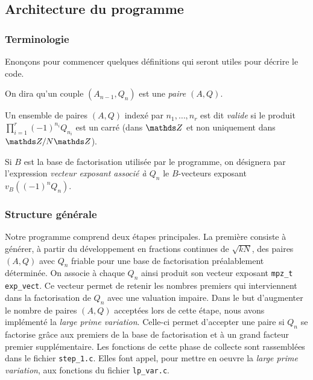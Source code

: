 \subsection{Architecture du programme}

\subsubsection{Terminologie}

Enonçons pour commencer quelques définitions qui seront utiles pour décrire le code.


\begin{definition}
	On dira qu'un couple $(A_{n-1}, Q_n)$ est une \emph{paire $(A, Q)$}.
\end{definition}

\begin{definition}
	Un ensemble de paires $(A, Q)$ indexé par $n_1, \dots, n_r$ est dit
	\emph{valide} si le produit $\prod_{i=1}^r (-1)^{n_i} Q_{n_i}$ est un carré
	(dans $\Z$ et non uniquement dans $\Z/N\Z$).
\end{definition}

\begin{definition}
    Si $B$ est la base de factorisation utilisée par le programme, on 
    désignera par l'expression \emph{vecteur exposant associé à $Q_n$} 
    le $B$-vecteurs exposant $v_B((-1)^n Q_n)$.
\end{definition}

\subsubsection{Structure générale}

Notre programme comprend deux étapes principales. La première consiste à générer, 
à partir du développement en fractions continues de $ \sqrt{kN} $, des paires 
$(A, Q)$ avec $Q_n$ friable pour une base de factorisation préalablement déterminée.
On associe à chaque $Q_n$ ainsi produit son vecteur exposant \texttt{mpz\_t exp\_vect}.
Ce vecteur permet de retenir les nombres premiers qui interviennent dans la 
factorisation de $Q_n$ avec une valuation impaire. Dans le but d'augmenter le nombre
de paires $(A,Q) $ acceptées lors de cette étape, nous avons implémenté la 
\textit{large prime variation}. Celle-ci permet d'accepter une paire si $Q_n$ se
factorise  grâce aux premiers de la base de factorisation et à un grand facteur
premier supplémentaire. Les fonctions de cette phase de collecte sont rassemblées
dans le fichier \texttt{step\_1.c}. Elles font appel, pour mettre en oeuvre la 
\textit{large prime variation}, aux fonctions du fichier \texttt{lp\_var.c}. \\
 
